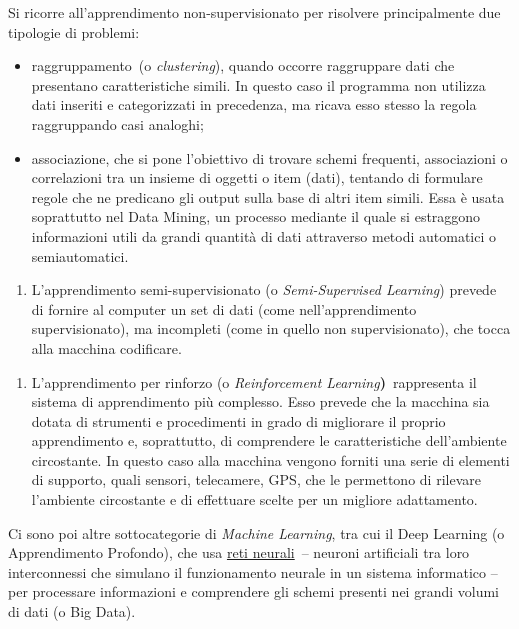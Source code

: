 {{Si ricorre all'apprendimento non-supervisionato per risolvere
principalmente due tipologie di problemi:

\begin{itemize}
\item
  raggruppamento~(o \emph{clustering}), quando occorre raggruppare dati
  che presentano caratteristiche simili. In questo caso il programma non
  utilizza dati inseriti e categorizzati in precedenza, ma ricava esso
  stesso la regola raggruppando casi analoghi;
\item
  associazione, che si pone l'obiettivo di trovare schemi frequenti,
  associazioni o correlazioni tra un insieme di oggetti o item (dati),
  tentando di formulare regole che ne predicano gli output sulla base di
  altri item simili. Essa è usata soprattutto nel Data Mining, un
  processo mediante il quale si estraggono informazioni utili da grandi
  quantità di dati attraverso metodi automatici o semiautomatici.
\end{itemize}

\begin{enumerate}
\def\labelenumi{\arabic{enumi}.}
\setcounter{enumi}{2}
\item
  L'apprendimento semi-supervisionato (o \emph{Semi-Supervised
  Learning}) prevede di fornire al computer un set di dati (come
  nell'apprendimento supervisionato), ma incompleti (come in quello non
  supervisionato), che tocca alla macchina codificare.
\end{enumerate}

\begin{enumerate}
\def\labelenumi{\arabic{enumi}.}
\setcounter{enumi}{3}
\item
  L'apprendimento per rinforzo (o \emph{Reinforcement
  Learning}\textbf{)}~rappresenta il sistema di apprendimento più
  complesso. Esso prevede che la macchina sia dotata di strumenti e
  procedimenti in grado di migliorare il proprio apprendimento e,
  soprattutto, di comprendere le caratteristiche dell'ambiente
  circostante. In questo caso alla macchina vengono forniti una serie di
  elementi di supporto, quali sensori, telecamere, GPS, che le
  permettono di rilevare l'ambiente circostante e di effettuare scelte
  per un migliore adattamento.
\end{enumerate}

Ci sono poi altre sottocategorie di \emph{Machine Learning}, tra cui il
Deep Learning (o Apprendimento Profondo), che usa
\href{https://www.ai4business.it/intelligenza-artificiale/deep-learning/reti-neurali/}{reti
neurali}~-- neuroni artificiali tra loro interconnessi che simulano il
funzionamento neurale in un sistema informatico -- per processare
informazioni e comprendere gli schemi presenti nei grandi volumi di dati
(o Big Data).

}}
